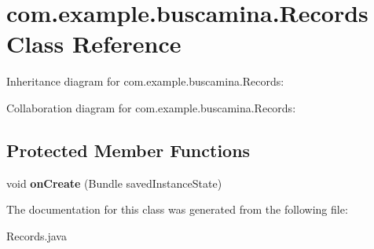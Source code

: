 \section{com.\-example.\-buscamina.\-Records Class Reference}
\label{classcom_1_1example_1_1buscamina_1_1_records}


Inheritance diagram for com.\-example.\-buscamina.\-Records\-:


Collaboration diagram for com.\-example.\-buscamina.\-Records\-:
\subsection*{Protected Member Functions}
\begin{DoxyCompactItemize}
\item 
void {\bfseries on\-Create} (Bundle saved\-Instance\-State)\label{classcom_1_1example_1_1buscamina_1_1_records_a7cdcb53451a9c5086b60ac0805a975be}

\end{DoxyCompactItemize}


The documentation for this class was generated from the following file\-:\begin{DoxyCompactItemize}
\item 
Records.\-java\end{DoxyCompactItemize}
